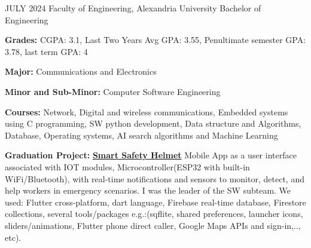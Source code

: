 

\begin{cventries}

  \cventry
    {JULY 2024} %
    {Faculty of Engineering, Alexandria University} %
    {Bachelor of Engineering} %
    {} %
    {
      \begin{cvitems} %
        \item {\textbf{Grades:} \hspace{0.05 cm} CGPA: 3.1,\hspace{0.1 cm} Last Two Years Avg GPA: 3.55,\hspace{0.1 cm} Penultimate semester GPA: 3.78,\hspace{0.1 cm} last term GPA: 4}
        \item {\textbf{Major:} Communications and Electronics}
        \item {\textbf{Minor and Sub-Minor:} Computer Software Engineering }
        \item {\textbf{Courses:} Network, Digital and wireless communications, Embedded systems using C programming, SW python development, Data structure and Algorithms, Database, Operating systems, AI search algorithms and Machine Learning}
        \item {\textbf{Graduation Project:} \textbf{\textcolor{cyan}{\href{https://github.com/AsmaaJAH/smarthelmet}{Smart Safety Helmet}}} Mobile App as a user interface associated with IOT modules, Microcontroller(ESP32 with built-in WiFi/Bluetooth), with real-time notifications and sensors to monitor, detect, and help workers in emergency scenarios. I was the leader of the SW subteam. We used: Flutter cross-platform, dart language, Firebase real-time database, Firestore collections, several tools/packages e.g.:(sqflite, shared preferences, launcher icons, sliders/animations, Flutter phone direct caller, Google Maps APIs and sign-in,.., etc).}
      \end{cvitems}
    }

\end{cventries}
